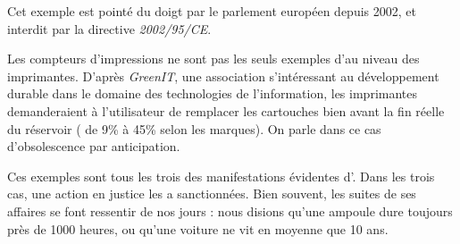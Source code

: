 Cet exemple est pointé du doigt par le parlement européen depuis 2002, et interdit par la directive \textit{2002/95/CE}. 
\smallbreak

Les compteurs d'impressions ne sont pas les seuls exemples d'\op au niveau des imprimantes. D'après \textit{GreenIT}\cite{greenit_cartouche_encre}, une association s'intéressant au développement durable  dans le domaine des technologies de l'information, les imprimantes demanderaient à l'utilisateur de remplacer les cartouches bien avant la fin réelle du réservoir ( de 9\% à 45\% selon les marques). On parle dans ce cas d'obsolescence par anticipation.


\medbreak

Ces exemples sont tous les trois des manifestations évidentes d'\op. Dans les trois cas, une action en justice les a sanctionnées. Bien souvent, les suites de ses affaires se font ressentir de nos jours : nous disions qu'une ampoule dure toujours près de 1000 heures, ou qu'une voiture ne vit en moyenne que 10 ans. 
